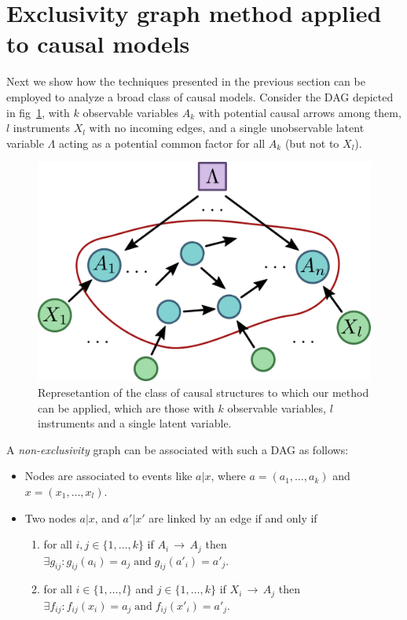 \documentclass[letterpaper]{article}
\newcommand{\et}{\;\mathrm{and}\;}
\begin{document}
\section{Exclusivity graph method applied to causal models}
Next we show how the techniques presented in the previous section can be employed to analyze
a broad class of causal models. Consider the DAG depicted in fig~\ref{fig:onelambda}, with
$k$ observable variables $A_k$ with potential causal arrows among them, $l$
instruments $X_l$ with no incoming edges, and a single unobservable latent
variable $\Lambda$ acting as a potential common factor for all $A_k$ (but not to
$X_l$).

\begin{figure}[h]
    \centering
    \includegraphics[width=.9\columnwidth]{images/onelambda.pdf}
    \caption{Represetantion of the class of causal structures to which our
        method can be applied, which are those with $k$ observable variables, $l$
        instruments and a single latent variable.}
    \label{fig:onelambda}
\end{figure}

A \emph{non-exclusivity} graph can be associated with such a DAG
as follows:
\begin{itemize}
    \item Nodes are associated to events like $a | x$, where $a = (a_1,\ldots,a_k)$ and  $x = (x_1,\ldots,x_l)$.
    \item Two nodes $a | x $, and $a' | x'$ are linked by an edge if and only if 
        \begin{enumerate}
            \item for all $i,j \in \{1 ,\ldots,k\}$ if $A_i\,
                \rightarrow\, A_j$ then $\exists g_{ij} : g_{ij}(a_i) = a_j
                \et g_{ij}(a'_i) = a'_j$.
            \item for all $i\in \{1,\ldots,l\}$ and $j\in \{1,\ldots,k\}$ if
                $X_i\,\rightarrow\,A_j$ then $\exists f_{ij} : f_{ij}(x_i) = a_j
                \et f_{ij}(x'_i) = a'_j$.
        \end{enumerate}
\end{itemize}
\end{document}
